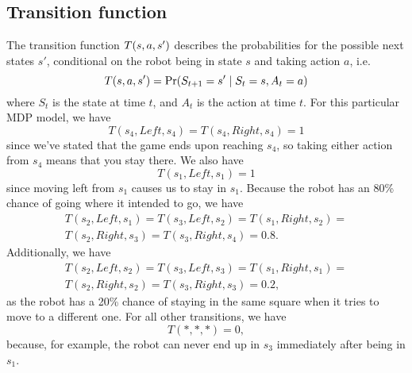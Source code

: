 \documentclass[a4paper]{article}
\begin{document}
\subsection{Transition function}
The transition function $T(s, a, s')$ describes the probabilities for
the possible next states $s'$, conditional on the robot being in state $s$
and taking action $a$,
i.e.
\begin{equation*}
T(s, a, s') = \Pr(S_{t+1}=s' \mid S_t=s, A_t=a)
\end{equation*}
where $S_t$ is the state at time $t$, and $A_t$ is the action at time $t$.
For this particular MDP model, we have
\begin{equation*}
T(s_4, Left, s_4) = T(s_4, Right, s_4) = 1
\end{equation*}
since we've stated that the game ends upon reaching $s_4$, so taking
either action from $s_4$ means that you stay there.
We also have
\begin{equation*}
T(s_1, Left, s_1) = 1
\end{equation*}
since moving left from $s_1$ causes us to stay in $s_1$.
Because the robot has an 80\% chance of going where it intended to go,
we have
\begin{gather*}
T(s_2, Left, s_1) =
T(s_3, Left, s_2) =
T(s_1, Right, s_2) =\\
T(s_2, Right, s_3) =
T(s_3, Right, s_4) = 0.8 .
\end{gather*}
Additionally, we have
\begin{gather*}
T(s_2, Left, s_2) =
T(s_3, Left, s_3) =
T(s_1, Right, s_1) =\\
T(s_2, Right, s_2) =
T(s_3, Right, s_3) = 0.2 ,
\end{gather*}
as the robot has a 20\% chance of staying in the same square when it
tries to move to a different one.
For all other transitions, we have
\begin{equation*}
  T(*, *, *) = 0 ,
\end{equation*}
because, for example, the robot can never end up in $s_3$ immediately
after being in $s_1$.
\end{document}
